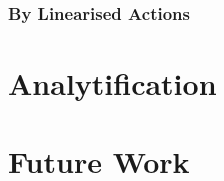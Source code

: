 \documentclass[12pt]{ociamthesis}  %
\begin{document}
\missingsection

\subsection{By Linearised Actions}

\missingsection

\chapter{Analytification}

\missingsection

\chapter{Future Work}

\missingsection

\pagebreak
\renewcommand{\bibname}{References}
\printbibliography
\end{document}
